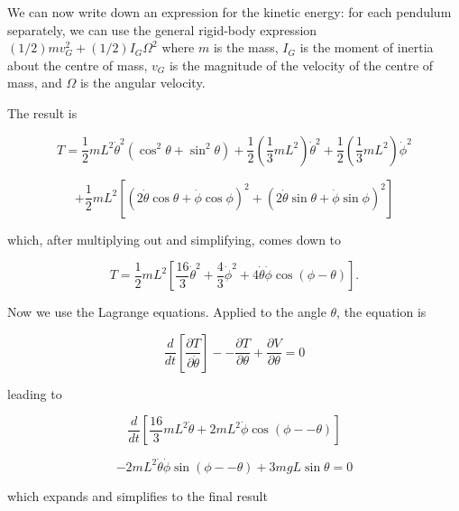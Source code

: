   We can now write down an expression for the kinetic energy: for each pendulum 
  separately, we can use the general rigid-body expression $(1/2)m v_G^2 + 
  (1/2) I_G \Omega^2$ where $m$ is the mass, $I_G$ is the moment of inertia 
  about the centre of mass, $v_G$ is the magnitude of the velocity of the 
  centre of mass, and $\Omega$ is the angular velocity. 

  The result is 

  \begin{equation*}T=\dfrac{1}{2}mL^2 \dot{\theta}^2 (\cos^2 \theta + \sin^2 
  \theta) +\dfrac{1}{2}\left(\dfrac{1}{3}mL^2\right) 
  \dot{\theta}^2+\dfrac{1}{2}\left(\dfrac{1}{3}mL^2\right) 
  \dot{\phi}^2\end{equation*} 

  \begin{equation*}+ \dfrac{1}{2}mL^2 \left[ \left(2 \dot{\theta}\cos \theta + 
  \dot{\phi}\cos \phi\right)^2 + \left(2 \dot{\theta}\sin \theta + 
  \dot{\phi}\sin \phi\right)^2 \right] \tag{6}\end{equation*} 

  \noindent{}which, after multiplying out and simplifying, comes down to 

  \begin{equation*}T=\dfrac{1}{2}mL^2 \left[ \dfrac{16}{3} \dot{\theta}^2 + 
  \dfrac{4}{3} \dot{\phi}^2 + 4 \dot{\theta} \dot{\phi} \cos (\phi-\theta) 
  \right] . \tag{7}\end{equation*} 

  Now we use the Lagrange equations. Applied to the angle $\theta$, the 
  equation is 

  \begin{equation*}\dfrac{d}{dt}\left[ \dfrac{\partial T}{\partial 
  \dot{\theta}} \right] -- \dfrac{\partial T}{\partial \theta} + 
  \dfrac{\partial V}{\partial \theta} = 0 \tag{8}\end{equation*} 

  \noindent{}leading to 

  \begin{equation*}\dfrac{d}{dt}\left[\dfrac{16}{3}mL^2 \dot{\theta} + 2mL^2 
  \dot{\phi} \cos (\phi -- \theta) \right] \end{equation*} 

  \begin{equation*}-2mL^2 \dot{\theta} \dot{\phi} \sin (\phi -- \theta) + 3mgL 
  \sin \theta = 0 \tag{9}\end{equation*} 

  \noindent{}which expands and simplifies to the final result 

